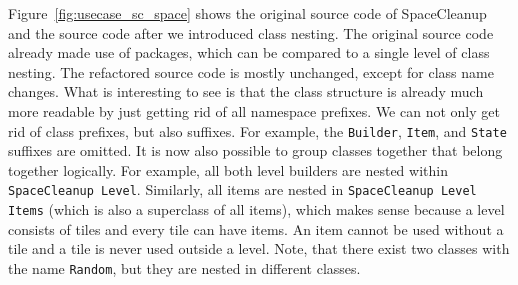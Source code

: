 Figure~\ref{fig:usecase_sc_space} shows the original source code of SpaceCleanup and the source code after we introduced class nesting. The original source code already made use of packages, which can be compared to a single level of class nesting. The refactored source code is mostly unchanged, except for class name changes. What is interesting to see is that the class structure is already much more readable by just getting rid of all namespace prefixes. We can not only get rid of class prefixes, but also suffixes. For example, the \texttt{Builder}, \texttt{Item}, and \texttt{State} suffixes are omitted. It is now also possible to group classes together that belong together logically. For example, all both level builders are nested within \texttt{SpaceCleanup Level}. Similarly, all items are nested in \texttt{SpaceCleanup Level Items} (which is also a superclass of all items), which makes sense because a level consists of tiles and every tile can have items. An item cannot be used without a tile and a tile is never used outside a level. Note, that there exist two classes with the name \texttt{Random}, but they are nested in different classes.


